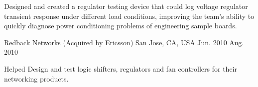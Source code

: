\begin{cventries}
{\begin{cvitems}
            \item{Designed and created a regulator testing device that could log voltage regulator transient response under different load conditions, improving the team's ability to quickly diagnose power conditioning problems of engineering sample boards.}
            \end{cvitems}
        }
        {Redback Networks (Acquired by Ericsson)}
        {San Jose, CA, USA}
        {Jun. 2010 \- Aug. 2010}
        {\begin{cvitems}
          \item{Helped Design and test logic shifters, regulators and fan controllers for their networking products.}
      \end{cvitems}
  }
    \end{cventries}
